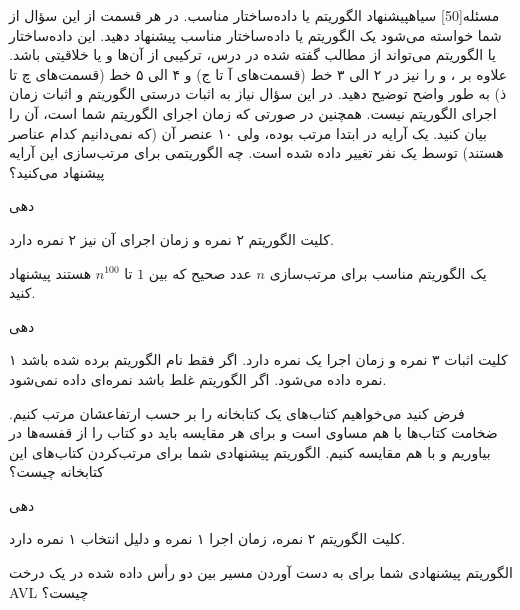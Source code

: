 ‌مسئله[50] ‌سیاه{پیشنهاد الگوریتم یا داده‌ساختار مناسب}. در هر قسمت از این سؤال از شما خواسته می‌شود یک الگوریتم یا داده‌ساختار مناسب پیشنهاد دهید. این داده‌ساختار یا الگوریتم می‌تواند از مطالب گفته شده در درس، ترکیبی از آن‌ها و یا خلاقیتی باشد. علاوه بر ،  و  را نیز در ۲ الی ۳ خط (قسمت‌های آ تا ج) و ۴ الی ۵ خط (قسمت‌های چ تا ذ) به طور واضح توضیح دهید. در این سؤال نیاز به اثبات درستی الگوریتم و اثبات زمان اجرای الگوریتم نیست. همچنین در صورتی که زمان اجرای الگوریتم شما  است، آن را بیان کنید.
یک آرایه در ابتدا مرتب بوده، ولی ۱۰ عنصر آن (که نمی‌دانیم کدام عناصر هستند) توسط یک نفر تغییر داده شده است. چه الگوریتمی برای مرتب‌سازی این آرایه پیشنهاد می‌کنید؟

‌دهی{
	کلیت الگوریتم ۲ نمره و زمان اجرای آن نیز ۲ نمره دارد.
	
}

یک الگوریتم  مناسب برای مرتب‌سازی $n$ عدد صحیح که بین $1$ تا $n^{100}$ هستند پیشنهاد کنید.

‌دهی{
	کلیت اثبات ۳ نمره و زمان اجرا یک نمره دارد. اگر فقط نام الگوریتم برده شده باشد ۱ نمره داده می‌شود. اگر الگوریتم غلط باشد نمره‌ای داده نمی‌شود.
	
}

فرض کنید می‌خواهیم کتاب‌های یک کتابخانه را بر حسب ارتفاعشان مرتب کنیم. ضخامت کتاب‌ها با هم مساوی است و برای هر مقایسه باید دو کتاب را از قفسه‌ها در بیاوریم و با هم مقایسه کنیم. الگوریتم پیشنهادی شما برای مرتب‌کردن کتاب‌های این کتابخانه چیست؟

‌دهی{
	کلیت الگوریتم ۲ نمره، زمان اجرا ۱ نمره و دلیل انتخاب ۱ نمره دارد.
	
}

الگوریتم پیشنهادی شما برای به دست آوردن مسیر بین دو رأس داده شده در یک درخت AVL  چیست؟


